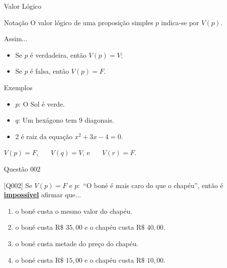 \documentclass[xcolor=dvipsnames,table]{beamer}
\begin{document}
 \begin{frame}{Valor Lógico}
 \begin{block}{Notação}
 	O valor lógico de uma proposição simples $p$ indica-se por $V(p)$.
 \end{block} \pause
 \begin{block}{Assim...}
 	\begin{itemize}[label=-]
 		\item Se $p$ é verdadeira, então $V(p) = V$; \pause
 		\item Se $p$ é falsa, então $V(p) = F$.
 	\end{itemize}
 \end{block} \pause
 \begin{exampleblock}{Exemplos}
 	\begin{itemize}[label=-]
 		\item $p$: O Sol é verde.
 		\item $q$: Um hexágono tem 9 diagonais.
 		\item 2 é raiz da equação $x^2 + 3x -4 = 0$.
 	\end{itemize} \pause
	
 	\begin{center}
 		$V(p) = F$, \ \ \ $V(q) = V$, e \ \ \ $V(r)= F$.
 	\end{center}
	
 \end{exampleblock}
 \end{frame}

 \begin{frame}{Questão 002}		
 \begin{block}{[Q002]}
 Se $V(p) = F$ e $p:$ ``O boné é mais caro do que o chapéu'', então é \underline{\bf impossível} afirmar que...
 \end{block}
 \begin{enumerate}[label=(\Alph*)]
 \item o boné custa o mesmo valor do chapéu.
 \item o boné custa R$\$$ $35,00$ e o chapéu custa R$\$$ $40,00$.
 \item o boné custa metade do preço do chapéu.
 \item o boné custa R$\$$ $15,00$ e o chapéu custa R$\$$ $10,00$.
 \end{enumerate}
 \end{frame}

\end{document}
